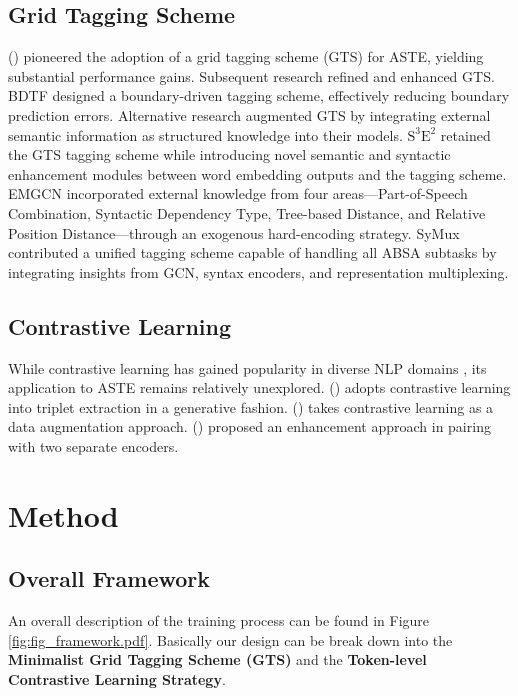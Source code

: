 \documentclass[11pt]{article}
\begin{document}
\subsection{Grid Tagging Scheme}
\citeauthor{wu2020grid} (\citeyear{wu2020grid}) pioneered the adoption of a grid tagging scheme (GTS) for ASTE, yielding substantial performance gains. 
Subsequent research refined and enhanced GTS. 
BDTF \cite{zhang2022boundary} designed a boundary-driven tagging scheme, effectively reducing boundary prediction errors. 
Alternative research augmented GTS by integrating external semantic information as structured knowledge into their models. $\mathrm{S}^3\mathrm{E}^2$ \cite{chen2021semantic} retained the GTS tagging scheme while introducing novel semantic and syntactic enhancement modules between word embedding outputs and the tagging scheme. EMGCN \cite{chen2022enhanced} incorporated external knowledge from four areas—Part-of-Speech Combination, Syntactic Dependency Type, Tree-based Distance, and Relative Position Distance—through an exogenous hard-encoding strategy.
SyMux \cite{fei2022inheriting} contributed a unified tagging scheme capable of handling all ABSA subtasks by integrating insights from GCN, syntax encoders, and representation multiplexing.


\subsection{Contrastive Learning}
While contrastive learning has gained popularity in diverse NLP domains \cite{wu2020clear, giorgi2021declutr, gao2021simcse, zhang2021supporting}, its application to ASTE remains relatively unexplored. \citeauthor{ye2021contrastive} (\citeyear{ye2021contrastive}) adopts contrastive learning into triplet extraction in a generative fashion. \citeauthor{wang2022contrastive} (\citeyear{wang2022contrastive}) takes contrastive learning as a data augmentation approach. \citeauthor{yang2023pairing} (\citeyear{yang2023pairing}) proposed an enhancement approach in pairing with two separate encoders.


\section{Method}
\subsection{Overall Framework}
\label{sec:Overall Framework}
An overall description of the training process can be found in Figure \ref{fig:fig_framework.pdf}.  Basically our design can be break down into the \textbf{Minimalist Grid Tagging Scheme (GTS)} and the \textbf{Token-level Contrastive Learning Strategy}. 
\end{document}
